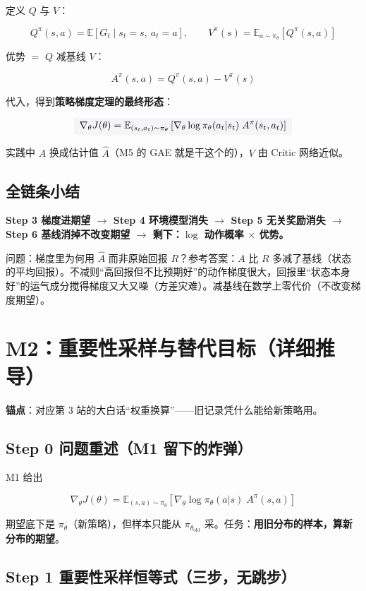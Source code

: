 \documentclass[UTF8,12pt,a4paper]{ctexrep}
\renewcommand{\boxed}[1]{{\colorbox{lightgray}{$\displaystyle #1$}}}
\newcommand{\selfcheck}[1]{\begin{checkb}#1\end{checkb}}
\newcommand{\flow}[1]{\par\medskip\noindent
  \begin{tcolorbox}[colback=main!6,colframe=main!6,boxrule=0pt,arc=2pt,
    left=8pt,right=8pt,top=5pt,bottom=5pt,halign=center,
    before skip=8pt,after skip=8pt]
    \color{main!85!black}\bfseries #1
  \end{tcolorbox}\par\medskip}
\begin{document}
定义 $Q$ 与 $V$：

$$
Q^{\pi}(s,a) = \mathbb{E}\left[G_t \mid s_t = s,\ a_t = a\right],
\qquad
V^{\pi}(s) = \mathbb{E}_{a \sim \pi_\theta}\left[Q^{\pi}(s,a)\right]
$$

优势 $=$ $Q$ 减基线 $V$：

$$
A^{\pi}(s,a) = Q^{\pi}(s,a) - V^{\pi}(s)
$$

代入，得到\textbf{策略梯度定理的最终形态}：

$$
\boxed{\;\nabla_\theta J(\theta) = \mathbb{E}_{(s_t, a_t) \sim \pi_\theta}\left[\nabla_\theta \log \pi_\theta(a_t|s_t)\; A^{\pi}(s_t, a_t)\right]\;}
$$

实践中 $A$ 换成估计值 $\hat{A}$（M5 的 GAE 就是干这个的），$V$ 由 Critic 网络近似。

\subsection*{全链条小结}

\flow{Step 3 梯度进期望 $\to$ Step 4 环境模型消失 $\to$ Step 5 无关奖励消失 $\to$ Step 6 基线消掉不改变期望 $\to$ 剩下：$\log$ 动作概率 $\times$ 优势。}

\selfcheck{问题：梯度里为何用 $\hat{A}$ 而非原始回报 $R$？\quad 参考答案：$A$ 比 $R$ 多减了基线（状态的平均回报）。不减则``高回报但不比预期好''的动作梯度很大，回报里``状态本身好''的运气成分搅得梯度又大又噪（方差灾难）。减基线在数学上零代价（不改变梯度期望）。}

\section{M2：重要性采样与替代目标（详细推导）}

\textbf{锚点}：对应第 3 站的大白话``权重换算''——旧记录凭什么能给新策略用。

\subsection*{Step 0 \; 问题重述（M1 留下的炸弹）}

M1 给出

$$
\nabla_\theta J(\theta) = \mathbb{E}_{(s,a) \sim \pi_\theta}\left[\nabla_\theta \log \pi_\theta(a|s)\; A^{\pi}(s,a)\right]
$$

期望底下是 $\pi_\theta$（新策略），但样本只能从 $\pi_{\theta_{\mathrm{old}}}$ 采。任务：\textbf{用旧分布的样本，算新分布的期望}。

\subsection*{Step 1 \; 重要性采样恒等式（三步，无跳步）}
\end{document}
